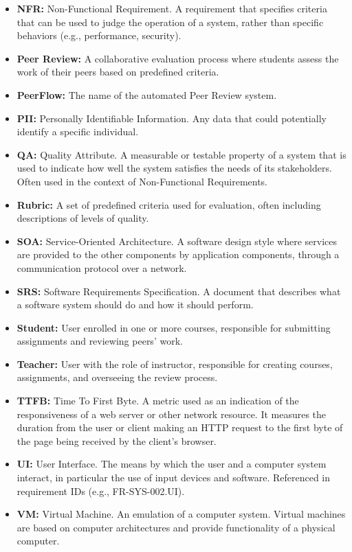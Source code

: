 \begin{justify}
\begin{itemize}
\item \textbf{NFR:} Non-Functional Requirement. A requirement that specifies criteria that can be used to judge the operation of a system, rather than specific behaviors (e.g., performance, security).
\item \textbf{Peer Review:} A collaborative evaluation process where students assess the work of their peers based on predefined criteria.
\item \textbf{PeerFlow:} The name of the automated Peer Review system.
\item \textbf{PII:} Personally Identifiable Information. Any data that could potentially identify a specific individual.
\item \textbf{QA:} Quality Attribute. A measurable or testable property of a system that is used to indicate how well the system satisfies the needs of its stakeholders. Often used in the context of Non-Functional Requirements.
\item \textbf{Rubric:} A set of predefined criteria used for evaluation, often including descriptions of levels of quality.
\item \textbf{SOA:} Service-Oriented Architecture. A software design style where services are provided to the other components by application components, through a communication protocol over a network.
\item \textbf{SRS:} Software Requirements Specification. A document that describes what a software system should do and how it should perform.
\item \textbf{Student:} User enrolled in one or more courses, responsible for submitting assignments and reviewing peers' work.
\item \textbf{Teacher:} User with the role of instructor, responsible for creating courses, assignments, and overseeing the review process.
\item \textbf{TTFB:} Time To First Byte. A metric used as an indication of the responsiveness of a web server or other network resource. It measures the duration from the user or client making an HTTP request to the first byte of the page being received by the client's browser.
\item \textbf{UI:} User Interface. The means by which the user and a computer system interact, in particular the use of input devices and software. Referenced in requirement IDs (e.g., FR-SYS-002.UI).
\item \textbf{VM:} Virtual Machine. An emulation of a computer system. Virtual machines are based on computer architectures and provide functionality of a physical computer.
\end{itemize}
\end{justify}

